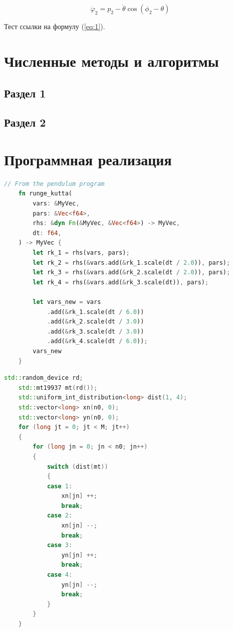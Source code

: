\documentclass[14pt,oneside]{extarticle}
\begin{document}
\begin{equation}
    \dot{\varphi}_{2}=p_{2}-\dot{\theta}\cos(\phi_{2}-\theta)
\end{equation}

Тест ссылки на формулу (\ref{eq:1}).

\pagebreak
\section{Численные методы и алгоритмы}

\subsection{Раздел 1}

\subsection{Раздел 2}

\pagebreak
\section{Программная реализация}

\begin{lstlisting}[language=rust,caption={Программная реализация метода Рунге-Кутты},label={listing-1}]
    // From the pendulum program
    fn runge_kutta(
        vars: &MyVec,
        pars: &Vec<f64>,
        rhs: &dyn Fn(&MyVec, &Vec<f64>) -> MyVec,
        dt: f64,
    ) -> MyVec {
        let rk_1 = rhs(vars, pars);
        let rk_2 = rhs(&vars.add(&rk_1.scale(dt / 2.0)), pars);
        let rk_3 = rhs(&vars.add(&rk_2.scale(dt / 2.0)), pars);
        let rk_4 = rhs(&vars.add(&rk_3.scale(dt)), pars);
    
        let vars_new = vars
            .add(&rk_1.scale(dt / 6.0))
            .add(&rk_2.scale(dt / 3.0))
            .add(&rk_3.scale(dt / 3.0))
            .add(&rk_4.scale(dt / 6.0));
        vars_new
    }
    \end{lstlisting}
    
    \begin{lstlisting}[language=C++,caption={Подпрограмма случайного блуждания на плоскости},label={listing-2}]
    std::random_device rd;
    std::mt19937 mt(rd());
    std::uniform_int_distribution<long> dist(1, 4);
    std::vector<long> xn(n0, 0);
    std::vector<long> yn(n0, 0);
    for (long jt = 0; jt < M; jt++)
    {
        for (long jn = 0; jn < n0; jn++)
        {
            switch (dist(mt))
            {
            case 1:
                xn[jn] ++;
                break;
            case 2:
                xn[jn] --;
                break;
            case 3:
                yn[jn] ++;
                break;
            case 4:
                yn[jn] --;
                break;
            }
        }
    }
    \end{lstlisting}
\end{document}
